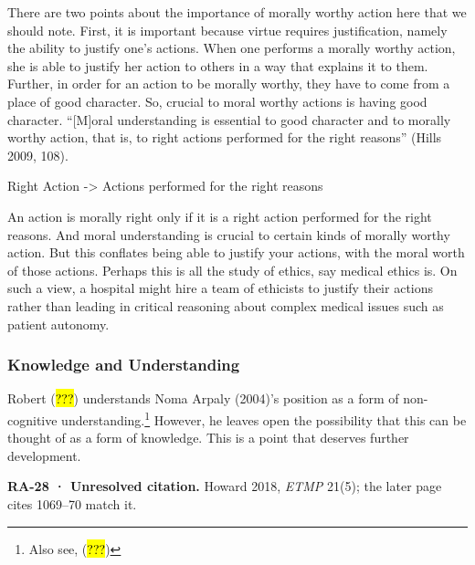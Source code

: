 \documentclass[
  letterpaper,
  DIV=11,
  numbers=noendperiod]{scrartcl}
\theoremstyle{remark}
\begin{document}
There are two points about the importance of morally worthy action here
that we should note. First, it is important because virtue requires
justification, namely the ability to justify one's actions. When one
performs a morally worthy action, she is able to justify her action to
others in a way that explains it to them. Further, in order for an
action to be morally worthy, they have to come from a place of good
character. So, crucial to moral worthy actions is having good character.
``{[}M{]}oral understanding is essential to good character and to
morally worthy action, that is, to right actions performed for the right
reasons'' (Hills 2009, 108).

Right Action -\textgreater{} Actions performed for the right reasons

An action is morally right only if it is a right action performed for
the right reasons. And moral understanding is crucial to certain kinds
of morally worthy action. But this conflates being able to justify your
actions, with the moral worth of those actions. Perhaps this is all the
study of ethics, say medical ethics is. On such a view, a hospital might
hire a team of ethicists to justify their actions rather than leading in
critical reasoning about complex medical issues such as patient
autonomy.

\subsubsection{Knowledge and
Understanding}\label{knowledge-and-understanding}

Robert (\hl{???}) understands Noma Arpaly (2004)'s position as a form of
non-cognitive understanding.\footnote{Also see, (\hl{???})} However, he
leaves open the possibility that this can be thought of as a form of
knowledge. This is a point that deserves further development.

\begin{tcolorbox}[enhanced jigsaw, arc=.35mm, bottomrule=.15mm, bottomtitle=1mm, breakable, colback=white, colbacktitle=quarto-callout-warning-color!10!white, colframe=quarto-callout-warning-color-frame, coltitle=black, left=2mm, leftrule=.75mm, opacityback=0, opacitybacktitle=0.6, rightrule=.15mm, title=\textcolor{quarto-callout-warning-color}{\faExclamationTriangle}\hspace{0.5em}{Warning}, titlerule=0mm, toprule=.15mm, toptitle=1mm]

\textbf{RA-28 · Unresolved citation.} Howard 2018, \emph{ETMP} 21(5);
the later page cites 1069--70 match it.

\end{tcolorbox}
\end{document}
